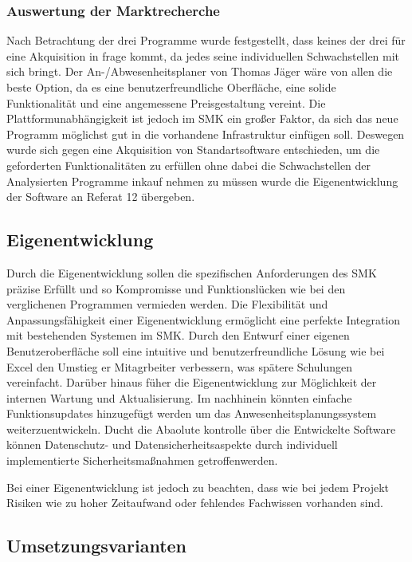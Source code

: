 \subsubsection{Auswertung der Marktrecherche}
\label{sec:AuswertungMarktrecherche}
Nach Betrachtung der drei Programme wurde festgestellt, dass keines der drei für eine Akquisition in frage kommt, da jedes seine individuellen Schwachstellen mit sich bringt. Der An-/Abwesenheitsplaner von Thomas Jäger wäre von allen die beste Option, da es eine benutzerfreundliche Oberfläche, eine solide Funktionalität und eine angemessene Preisgestaltung vereint. Die Plattformunabhängigkeit ist jedoch im SMK ein großer Faktor, da sich das neue Programm möglichst gut in die vorhandene Infrastruktur einfügen soll. Deswegen wurde sich gegen eine Akquisition von Standartsoftware entschieden, um die geforderten Funktionalitäten zu erfüllen ohne dabei die Schwachstellen der Analysierten Programme inkauf nehmen zu müssen wurde die Eigenentwicklung der Software an Referat 12 übergeben.

\subsection{Eigenentwicklung}
\label{sec:Eigenentwicklung}

Durch die Eigenentwicklung sollen die spezifischen Anforderungen des SMK präzise Erfüllt und so Kompromisse und Funktionslücken wie bei den verglichenen Programmen vermieden werden. Die Flexibilität und Anpassungsfähigkeit einer Eigenentwicklung ermöglicht eine perfekte Integration mit bestehenden Systemen im SMK. Durch den Entwurf einer eigenen Benutzeroberfläche soll eine intuitive und benutzerfreundliche Lösung wie bei Excel den Umstieg er Mitagrbeiter verbessern, was spätere Schulungen vereinfacht. Darüber hinaus füher die Eigenentwicklung zur Möglichkeit der internen Wartung und Aktualisierung. Im nachhinein könnten einfache Funktionsupdates hinzugefügt werden um das Anwesenheitsplanungssystem weiterzuentwickeln. Ducht die Abaolute kontrolle über die Entwickelte Software können Datenschutz- und Datensicherheitsaspekte durch individuell implementierte Sicherheitsmaßnahmen getroffenwerden. 

Bei einer Eigenentwicklung ist jedoch zu beachten, dass wie bei jedem Projekt Risiken wie zu hoher Zeitaufwand oder fehlendes Fachwissen vorhanden sind.


\subsection{Umsetzungsvarianten}
\label{sec:Umsetzungsvarianten}


